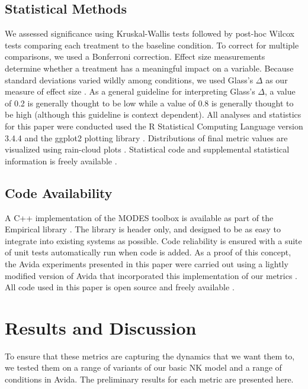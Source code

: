 \documentclass[letterpaper]{article}
\begin{document}
\subsection{Statistical Methods}

We assessed significance using Kruskal-Wallis tests followed by post-hoc Wilcox tests comparing each treatment to the baseline condition. To correct for multiple comparisons, we used a Bonferroni correction. Effect size measurements determine whether a treatment has a meaningful impact on a variable. Because standard deviations varied wildly among conditions, we used Glass's $\Delta$ as our measure of effect size \citep{hedges_distribution_1981}. As a general guideline for interpreting Glass's $\Delta$, a value of 0.2 is generally thought to be low while a value of 0.8 is generally thought to be high (although this guideline is context dependent). All analyses and statistics for this paper were conducted used the R Statistical Computing Language version 3.4.4 \citep{r_core_team_r:_2017} and the ggplot2 plotting library \citep{wickham_ggplot2:_2016}. Distributions of final metric values are visualized using rain-cloud plots \citep{allen_raincloud_2018}. Statistical code and supplemental statistical information is freely available \citep{zenodo_dolson_data_2018}.

\subsection{Code Availability}
A C++ implementation of the MODES toolbox is available as part of the Empirical library \citep{zenodo_ofria_empirical_2018}. The library is header only, and designed to be as easy to integrate into existing systems as possible. Code reliability is ensured with a suite of unit tests automatically run when code is added. As a proof of this concept, the Avida experiments presented in this paper were carried out using a lightly modified version of Avida that incorporated this implementation of our metrics \citep{zenodo_bryson_avida_2018}. All code used in this paper is open source and freely available \citep{zenodo_dolson_data_2018,zenodo_bryson_avida_2018,zenodo_ofria_empirical_2018}.


\section{Results and Discussion}
To ensure that these metrics are capturing the dynamics that we want them to, we tested them on a range of variants of our basic NK model and a range of conditions in Avida. The preliminary results for each metric are presented here.
\end{document}
